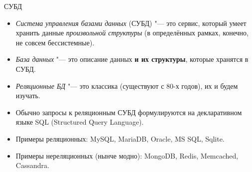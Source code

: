 \begin{frame}[t]{СУБД}
	\begin{itemize}
		\item \textit{Система управления базами данных} (СУБД) "--- это сервис, который умеет хранить данные \textit{произвольной структуры}
			(в определённых рамках, конечно, не совсем бессистемные).
		\item \textit{База данных} "--- это описание данных \textbf{и их структуры}, которые хранятся в СУБД.
		\item \textit{Реляционные БД} "--- это классика (существуют с 80-х годов), их и будем изучать.
		\item Обычно запросы к реляционным СУБД формулируются на декларативном языке SQL
			(Structured Query Language).
		\item Примеры реляционных: MySQL, MariaDB, Oracle, MS SQL, Sqlite.
		\item Примеры нереляционных (нынче модно): MongoDB, Redis, Memcached, Cassandra.
	\end{itemize}
\end{frame}

